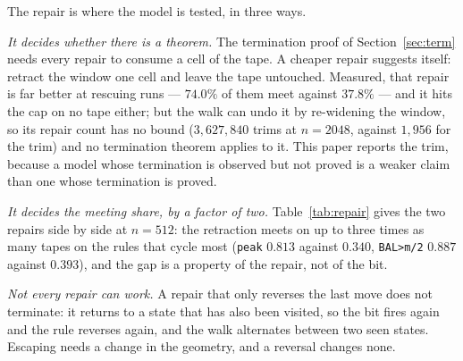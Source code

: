 \documentclass[11pt]{article}
\theoremstyle{remark}
\begin{document}
The repair is where the model is tested, in three ways.

\emph{It decides whether there is a theorem.} The termination proof of Section~\ref{sec:term} needs every
repair to consume a cell of the tape. A cheaper repair suggests itself: retract the window one cell and leave
the tape untouched. Measured, that repair is far better at rescuing runs --- $74.0\%$ of them meet against
$37.8\%$ --- and it hits the cap on no tape either; but the walk can undo it by re-widening the window, so its
repair count has no bound ($3{,}627{,}840$ trims at $n=2048$, against $1{,}956$ for the trim) and no
termination theorem applies to it. This paper reports the trim, because a model whose termination is observed
but not proved is a weaker claim than one whose termination is proved.

\emph{It decides the meeting share, by a factor of two.} Table~\ref{tab:repair} gives the two repairs side by
side at $n=512$: the retraction meets on up to three times as many tapes on the rules that cycle most
(\texttt{peak} $0.813$ against $0.340$, \texttt{BAL>m/2} $0.887$ against $0.393$), and the gap is a property
of the repair, not of the bit.

\emph{Not every repair can work.} A repair that only reverses the last move does not terminate: it returns
to a state that has also been visited, so the bit fires again and the rule reverses again, and the walk
alternates between two seen states. Escaping needs a change in the geometry, and a reversal changes none.

\begin{table}[t]
\centering
\small

\caption{The aggregate at the three sizes, over the twenty rules that were run (\texttt{monotone} is
analytic and enters no cell). The meeting rate falls slowly with $n$ while the cap share rises: divergence is
not a small-size artefact. The last column is the largest number of repair trims a single run needed; it is
always at most $n$, as the theorem requires.}
\label{tab:agg}
\end{table}

\begin{table}[t]
\centering
\small

\caption{The repair decides the rescue rate: the window retraction against the trim, at $n=512$, as the share
of tapes that meet. The retraction is better everywhere and far better on the rules that cycle most, and it
is the repair for which no termination bound holds.}
\label{tab:repair}
\end{table}
\end{document}
